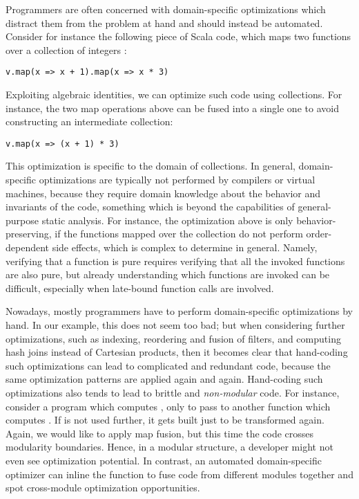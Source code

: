 Programmers
are often concerned with domain-specific optimizations which distract them from the problem at hand and should instead be automated.
Consider for instance the following piece of Scala code, which maps two functions over a collection of integers :

\begin{lstlisting}
v.map(x => x + 1).map(x => x * 3)
\end{lstlisting}

Exploiting algebraic identities, we can optimize such code using collections.
For instance, the two map operations above can be fused into a single one to avoid constructing an intermediate collection:

\begin{lstlisting}
v.map(x => (x + 1) * 3)
\end{lstlisting}

This optimization is specific to the domain of collections. In general, domain-specific optimizations are typically not performed by compilers or virtual machines, because they require domain knowledge
about the behavior and invariants of the code, something which is beyond the capabilities of general-purpose static analysis. For instance, the
optimization above is only behavior-preserving, if the functions mapped over the collection do not perform order-dependent side effects,
which is complex to determine in general. Namely, verifying that a function is pure requires verifying that all the invoked functions are also pure, but already understanding which functions are invoked can be difficult, especially when late-bound function calls are involved.

Nowadays, mostly programmers have to perform domain-specific optimizations by hand. In our example, this does not seem too bad; but
when considering further optimizations, such as indexing, reordering and fusion of filters, and computing hash joins
instead of Cartesian products, then it becomes clear that hand-coding such optimizations can lead to complicated
and redundant code, because the same optimization patterns are applied again and again. Hand-coding such optimizations also tends to lead to brittle and \emph{non-modular} code. For instance, consider a program which
computes , only to pass  to another function which computes
. If  is not used further, it gets built just to be transformed again. Again, we would like to apply map fusion, but this time the code crosses modularity boundaries. Hence, in a modular structure, a developer might not even see optimization potential.
In contrast, an automated domain-specific optimizer can inline the function to fuse code from different modules together
 and spot cross-module optimization opportunities.

